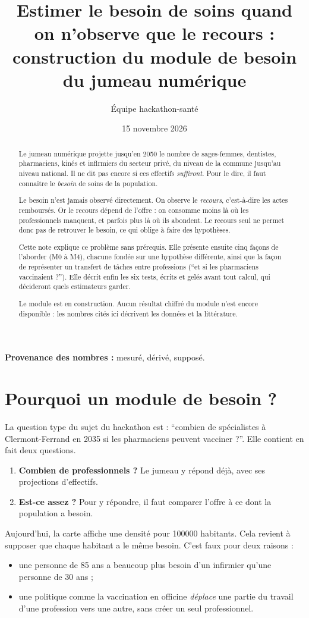 \documentclass[11pt]{article}
\title{Estimer le besoin de soins quand on n'observe que le recours :\\
construction du module de besoin du jumeau numérique}
\author[1]{Équipe hackathon-santé}
\affil[1]{Note de travail interne, dépôt \texttt{hackathon-sante/v2}}
\date{15 novembre 2026}
\begin{document}
\maketitle

\begin{abstract}
Le jumeau numérique projette jusqu'en 2050 le nombre de sages-femmes, dentistes, pharmaciens, kinés et infirmiers du
secteur privé, du niveau de la commune jusqu'au niveau national. Il ne dit pas encore si ces effectifs \emph{suffiront}.
Pour le dire, il faut connaître le \emph{besoin} de soins de la population.

Le besoin n'est jamais observé directement. On observe le \emph{recours}, c'est-à-dire les actes remboursés. Or le
recours dépend de l'offre : on consomme moins là où les professionnels manquent, et parfois plus là où ils abondent. Le
recours seul ne permet donc pas de retrouver le besoin, ce qui oblige à faire des hypothèses.

Cette note explique ce problème sans prérequis. Elle présente ensuite cinq façons de l'aborder (M0 à M4), chacune
fondée sur une hypothèse différente, ainsi que la façon de représenter un transfert de tâches entre professions
(\enquote{et si les pharmaciens vaccinaient ?}). Elle décrit enfin les six tests, écrits et gelés avant tout calcul,
qui décideront quels estimateurs garder.

Le module est en construction. Aucun résultat chiffré du module n'est encore disponible : les nombres cités ici
décrivent les données et la littérature.
\end{abstract}
\noindent\textbf{Provenance des nombres :} \mesure{} mesuré, \derive{} dérivé, \suppose{} supposé.

\section{Pourquoi un module de besoin ?}
La question type du sujet du hackathon est : \enquote{combien de spécialistes à Clermont-Ferrand en 2035 si les
pharmaciens peuvent vacciner ?}. Elle contient en fait deux questions.
\begin{enumerate}
  \item \textbf{Combien de professionnels ?} Le jumeau y répond déjà, avec ses projections d'effectifs.
  \item \textbf{Est-ce assez ?} Pour y répondre, il faut comparer l'offre à ce dont la population a besoin.
\end{enumerate}

Aujourd'hui, la carte affiche une densité pour \num{100000} habitants. Cela revient à supposer que chaque habitant a
le même besoin. C'est faux pour deux raisons :
\begin{itemize}
  \item une personne de 85 ans a beaucoup plus besoin d'un infirmier qu'une personne de 30 ans ;
  \item une politique comme la vaccination en officine \emph{déplace} une partie du travail d'une profession vers
    une autre, sans créer un seul professionnel.
\end{itemize}
\end{document}
